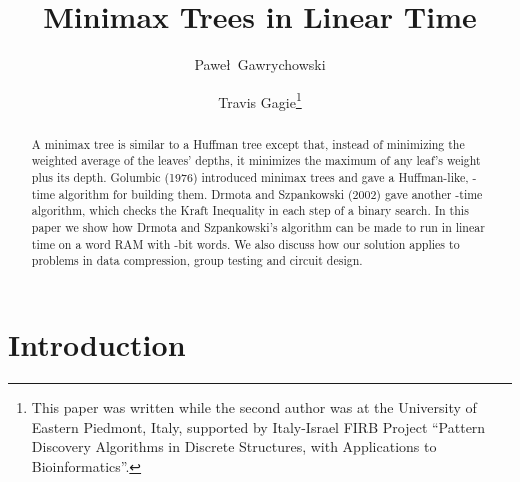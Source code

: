 \documentclass[runningheads]{llncs}
\begin{document}
\title{Minimax Trees in Linear Time}
\author{Pawe\l\ Gawrychowski
    \and Travis Gagie\fnmsep\thanks
    {This paper was written while the second author was at the University of Eastern Piedmont, Italy, supported by Italy-Israel FIRB Project ``Pattern Discovery Algorithms in Discrete Structures, with Applications to Bioinformatics''.}}
\maketitle

\begin{abstract}
A minimax tree is similar to a Huffman tree except that, instead of minimizing the weighted average of the leaves' depths, it minimizes the maximum of any leaf's weight plus its depth.  Golumbic (1976) introduced minimax trees and gave a Huffman-like, -time algorithm for building them.  Drmota and Szpankowski (2002) gave another -time algorithm, which checks the Kraft Inequality in each step of a binary search.  In this paper we show how Drmota and Szpankowski's algorithm can be made to run in linear time on a word RAM with -bit words.  We also discuss how our solution applies to problems in data compression, group testing and circuit design.
\end{abstract}

\section{Introduction} \label{sec:intro}
\end{document}
